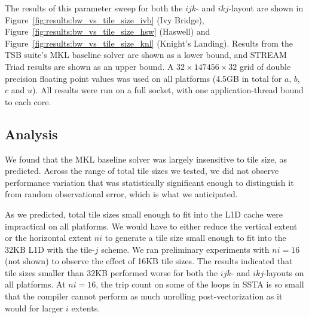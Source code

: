 \documentclass[10pt, conference, compsocconf]{IEEEtran}
\begin{document}
The results of this parameter sweep for both the \(ijk\)- and \(ikj\)-layout are
  shown in Figure~\ref{fig:results:bw_vs_tile_size_ivb} (Ivy Bridge),
  Figure~\ref{fig:results:bw_vs_tile_size_hsw} (Haswell) and
  Figure~\ref{fig:results:bw_vs_tile_size_knl} (Knight's Landing).
Results from the TSB suite's MKL baseline solver are shown as a lower bound,
  and STREAM Triad results are shown as an upper bound. 
A \(32 \times 147456 \times 32\) grid of double precision floating point values
  was used on all platforms (4.5GB in total for \(a\), \(b\), \(c\) and \(u\)).
All results were run on a full socket, with one application-thread bound to each
  core.

\subsection{Analysis}
\label{sec:results:analysis}

We found that the MKL baseline solver was largely insensitive to tile size, as
  predicted.
Across the range of total tile sizes we tested, we did not observe performance
  variation that was statistically significant enough to distinguish it from
  random observational error, which is what we anticipated.

As we predicted, total tile sizes small enough to fit into the L1D cache were
  impractical on all platforms.
We would have to either reduce the vertical extent or the horizontal
  extent \(ni\) to generate a tile size small enough to fit into the 32KB L1D
  with the tile-\(j\) scheme.
We ran preliminary experiments with \(ni=16\) (not shown) to observe the effect
  of 16KB tile sizes.
The results indicated that tile sizes smaller than 32KB performed worse for both
  the \(ijk\)- and \(ikj\)-layouts on all platforms.
At \(ni=16\), the trip count on some of the loops in SSTA is so small that the
  compiler cannot perform as much unrolling post-vectorization as it would for
  larger \(i\) extents.

\end{document}
